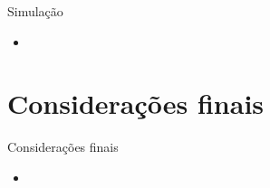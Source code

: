 \documentclass[10pt]{sintefbeamer}
\begin{document}
\begin{frame}{Simulação}
	\begin{itemize}[<+->]
		\item 
	\end{itemize}
\end{frame}



\section{Considerações finais}

\begin{frame}{Considerações finais}
	\begin{itemize}
		\item 
	\end{itemize}
\end{frame}



\bibliographpage



\backmatter
\end{document}
